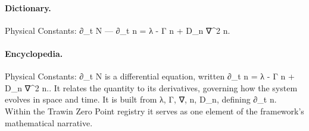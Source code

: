 \paragraph{Dictionary.}
Physical Constants: ∂\_t N — ∂\_t n = λ - Γ n + D\_n ∇\textasciicircum{}2 n.

\paragraph{Encyclopedia.}
Physical Constants: ∂\_t N is a differential equation, written ∂\_t n = λ - Γ n + D\_n ∇\textasciicircum{}2 n.. It relates the quantity to its derivatives, governing how the system evolves in space and time. It is built from λ, Γ, ∇, n, D\_n, defining ∂\_t n. Within the Trawin Zero Point registry it serves as one element of the framework's mathematical narrative.
